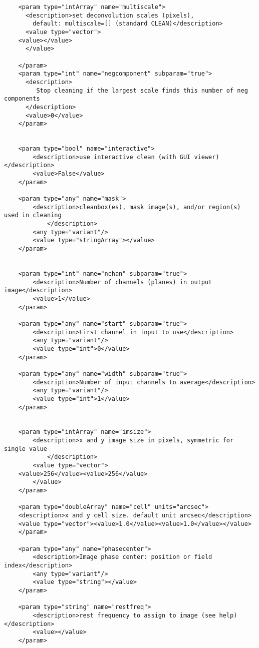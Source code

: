 \begin{verbatim}
    <param type="intArray" name="multiscale">
      <description>set deconvolution scales (pixels), 
        default: multiscale=[] (standard CLEAN)</description>
      <value type="vector">
	<value></value>
      </value>

    </param>
    <param type="int" name="negcomponent" subparam="true">
      <description>
         Stop cleaning if the largest scale finds this number of neg components
      </description>
      <value>0</value>
    </param>


    <param type="bool" name="interactive">
	    <description>use interactive clean (with GUI viewer)</description>
	    <value>False</value>
    </param>

    <param type="any" name="mask">
	    <description>cleanbox(es), mask image(s), and/or region(s)  used in cleaning
            </description>
	    <any type="variant"/>
	    <value type="stringArray"></value>
    </param>


    <param type="int" name="nchan" subparam="true">
	    <description>Number of channels (planes) in output image</description>
	    <value>1</value>
    </param>

    <param type="any" name="start" subparam="true">
	    <description>First channel in input to use</description>
	    <any type="variant"/>
	    <value type="int">0</value>
    </param>

    <param type="any" name="width" subparam="true">
	    <description>Number of input channels to average</description>
	    <any type="variant"/>
	    <value type="int">1</value>
    </param>


    <param type="intArray" name="imsize">
	    <description>x and y image size in pixels, symmetric for single value
            </description>
	    <value type="vector">
    <value>256</value><value>256</value>
	    </value>
    </param>

    <param type="doubleArray" name="cell" units="arcsec">
    <description>x and y cell size. default unit arcsec</description>
    <value type="vector"><value>1.0</value><value>1.0</value></value>
    </param>

    <param type="any" name="phasecenter">
	    <description>Image phase center: position or field index</description>
	    <any type="variant"/>
	    <value type="string"></value>
    </param>

    <param type="string" name="restfreq">
	    <description>rest frequency to assign to image (see help)</description>
	    <value></value>
    </param>


\end{verbatim}
